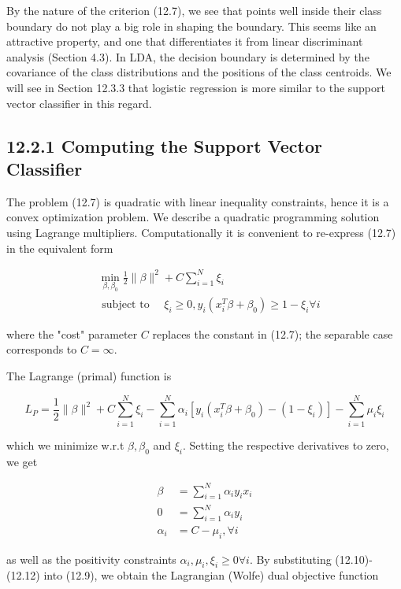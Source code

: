 \documentclass[10pt]{article}
\begin{document}
By the nature of the criterion (12.7), we see that points well inside their class boundary do not play a big role in shaping the boundary. This seems like an attractive property, and one that differentiates it from linear discriminant analysis (Section 4.3). In LDA, the decision boundary is determined by the covariance of the class distributions and the positions of the class centroids. We will see in Section 12.3.3 that logistic regression is more similar to the support vector classifier in this regard.

\subsection*{12.2.1 Computing the Support Vector Classifier}
The problem (12.7) is quadratic with linear inequality constraints, hence it is a convex optimization problem. We describe a quadratic programming solution using Lagrange multipliers. Computationally it is convenient to re-express (12.7) in the equivalent form


\begin{align*}
& \min _{\beta, \beta_{0}} \frac{1}{2}\|\beta\|^{2}+C \sum_{i=1}^{N} \xi_{i}  \tag{12.8}\\
& \text { subject to } \quad \xi_{i} \geq 0, y_{i}\left(x_{i}^{T} \beta+\beta_{0}\right) \geq 1-\xi_{i} \forall i
\end{align*}


where the "cost" parameter $C$ replaces the constant in (12.7); the separable case corresponds to $C=\infty$.

The Lagrange (primal) function is


\begin{equation*}
L_{P}=\frac{1}{2}\|\beta\|^{2}+C \sum_{i=1}^{N} \xi_{i}-\sum_{i=1}^{N} \alpha_{i}\left[y_{i}\left(x_{i}^{T} \beta+\beta_{0}\right)-\left(1-\xi_{i}\right)\right]-\sum_{i=1}^{N} \mu_{i} \xi_{i} \tag{12.9}
\end{equation*}


which we minimize w.r.t $\beta, \beta_{0}$ and $\xi_{i}$. Setting the respective derivatives to zero, we get


\begin{align*}
\beta & =\sum_{i=1}^{N} \alpha_{i} y_{i} x_{i}  \tag{12.10}\\
0 & =\sum_{i=1}^{N} \alpha_{i} y_{i}  \tag{12.11}\\
\alpha_{i} & =C-\mu_{i}, \forall i \tag{12.12}
\end{align*}


as well as the positivity constraints $\alpha_{i}, \mu_{i}, \xi_{i} \geq 0 \forall i$. By substituting (12.10)-(12.12) into (12.9), we obtain the Lagrangian (Wolfe) dual objective function
\end{document}
